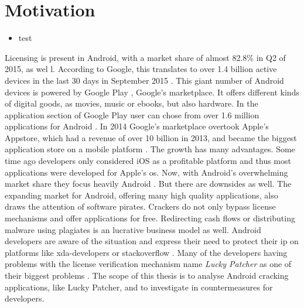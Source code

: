 \section{Motivation} \label{subsection:introduction-motivation}
\begin{itemize}
    \item test
\end{itemize}
Licensing is present in Android, with a market share of almost 82.8\% in Q2 of 2015,  as wel \cite{androidShare}l.
According to Google, this translates to over 1.4 billion active devices in the last 30 days in September 2015 \cite{androidDevices}.
This giant number of Android devices is powered by Google Play \cite{googlePlay}, Google's marketplace.
It offers different kinds of digital goods, as movies, music or ebooks, but also hardware.
In the application section of Google Play user can chose from over 1.6 million applications for Android \cite{statistaAppStore}.
In 2014 Google's marketplace overtook Apple's Appstore, which had a revenue of over 10 billion in 2013, and became the biggest application store on a mobile platform \cite{wiwoValue}.
\newline
The growth has many advantages.
Some time ago developers only considered iOS as a profitable platform and thus most applications were developed for Apple's \gls{os}.
Now, with Android's overwhelming market share they focus heavily Android \cite{businessProfit}.
But there are downsides as well.
The expanding market for Android, offering many high quality applications, also draws the attention of software pirates.
Crackers do not only bypass license mechanisms and offer applications for free.
Redirecting cash flows or distributing malware using plagiates is an lucrative business model as well.
Android developers are aware of the situation \cite{developersPiracy} and express their need to protect their \gls{ip} on platforms like xda-developers \cite{xdaPiracy} or stackoverflow \cite{stackoverflowPiracy}.
Many of the developers having problems with the license verification mechanism name \textit{Lucky Patcher} as one of their biggest problems \cite{stackoverflowLucky}.
\newline
\newline
The scope of this thesis is to analyse Android cracking applications, like Lucky Patcher,  and to investigate in countermeasures for developers.
